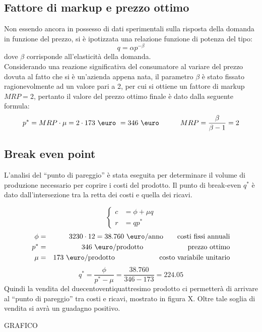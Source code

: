 \subsection{Fattore di markup e prezzo ottimo}
Non essendo ancora in possesso di dati sperimentali sulla risposta della domanda
in funzione del prezzo, si è ipotizzata una relazione funzione di potenza del
tipo: 
\begin{displaymath}
q = \alpha p^{-\beta}
\end{displaymath}
dove $\beta$ corrisponde all’elasticità della domanda.\\
Considerando una reazione significativa del consumatore al variare del prezzo
dovuta al fatto che si è un’azienda appena nata, il parametro $\beta$ è stato
fissato ragionevolmente ad un valore pari a 2, per cui si ottiene un fattore di
markup $MRP=2$, pertanto il valore del prezzo ottimo finale è dato dalla
seguente formula:
\begin{displaymath}
	p^* = MRP \cdot \mu =  2 \cdot 173 \ \mbox{\euro} \ = 346 \ \mbox{\euro}
\qquad\quad    MRP = \frac{\beta}{\beta-1} = 2
\end{displaymath}
\subsection{Break even point}
L’analisi del “punto di pareggio” è stata eseguita per determinare il volume di
produzione necessario per coprire i costi del prodotto.  Il punto di break-even
$q^*$ è dato dall’intersezione tra la retta dei costi e quella dei ricavi. 

\setlength\arraycolsep{2pt}
\begin{displaymath}
\left\{ \begin{array}{rl}
c &= \phi + \mu q \\
r &= q p^* 
\end{array} \right .
\end{displaymath}
%
\begin{eqnarray*}
\phi &=& 3230 \cdot 12 = 38.760 \ \mbox{\euro/anno} \qquad \mbox{costi fissi
annuali} \\
p^* &=& 346 \ \mbox{\euro/prodotto} \ \qquad\quad\qquad\quad \mbox{prezzo ottimo} \\
\mu &=& 173 \ \mbox{\euro/prodotto} \ \qquad\quad\qquad\quad \mbox{costo variabile unitario}
\end{eqnarray*}
%
\begin{displaymath}
q^* = \frac{\phi}{p^* - \mu} = \frac{38.760}{346 - 173} = 224.05
\end{displaymath}
Quindi la vendita del duecentoventiquattresimo prodotto ci permetterà di
arrivare al “punto di pareggio” tra costi e ricavi, mostrato in figura X. Oltre
tale soglia di vendita si avrà un guadagno positivo.

GRAFICO

